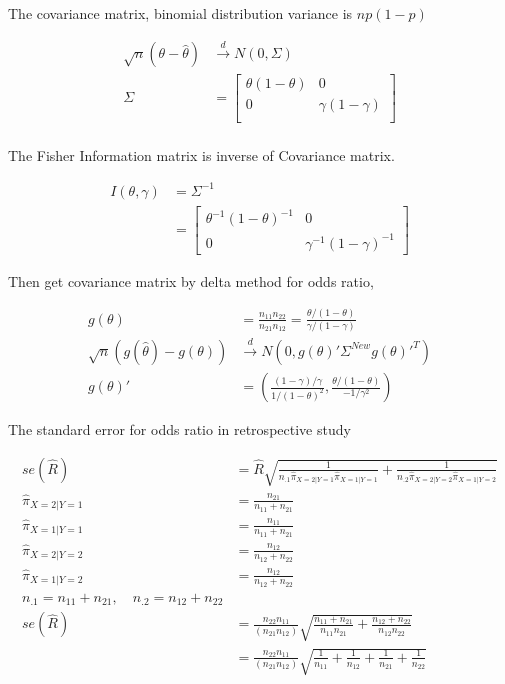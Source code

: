 	The covariance matrix, binomial distribution variance is $np(1-p)$
	
	\begin{align*}
		\sqrt{n} \left( \theta - \hat{\theta} \right) & \xrightarrow[]{d} N(0, \Sigma)\\
		\Sigma &= \begin{bmatrix}
			\theta(1-\theta) &  0 \\
			0 &  \gamma(1-\gamma) \\
		\end{bmatrix}\\
	\end{align*} 	
	
	The Fisher Information matrix is inverse of Covariance matrix.
	
	\begin{align*}
	  I(\theta, \gamma) &= \Sigma^{-1} \\
	  &= \begin{bmatrix}
			\theta^{-1}(1-\theta)^{-1} &  0 \\
			0 &  \gamma^{-1}(1-\gamma)^{-1} 
		\end{bmatrix}
	\end{align*} 		
	
	Then get covariance matrix by delta method for odds ratio, 
	
	\begin{align*}
		g(\theta) &= \frac{n_{11}n_{22}}{n_{21}n_{12}} = \frac{\theta/(1-\theta)}{\gamma/(1-\gamma)}\\
		\sqrt{n} \left( g(\hat\theta) - g({\theta}) \right) & \xrightarrow[]{d} N(0, g(\theta)' \Sigma^{New} g(\theta)'^T)\\  
		g(\theta)' &= \left( \frac{(1-\gamma)/\gamma}{1/(1-\theta)^2}, \frac{\theta/(1-\theta)}{-1/\gamma^2} \right)
	\end{align*} 
	
	The standard error for odds ratio in retrospective study
	
	\begin{align*}
		se(\hat R) &= \hat{R} \sqrt{\frac{1}{n_{.1}\hat{\pi}_{X=2|Y=1}\hat{\pi}_{X=1|Y=1} } + \frac{1}{n_{.2}\hat{\pi}_{X=2|Y=2} \hat {\pi}_{X=1|Y=2} } }\\
		\hat{\pi}_{X=2|Y=1} &= \frac{n_{21}}{n_{11}+ n_{21}}\\
		\hat{\pi}_{X=1|Y=1} &= \frac{n_{11}}{n_{11}+ n_{21}}\\
		\hat{\pi}_{X=2|Y=2} &=  \frac{n_{12}}{n_{12} + n_{22}}\\
		\hat {\pi}_{X=1|Y=2} &= \frac{n_{12}}{n_{12} + n_{22}}\\
		n_{.1} = n_{11}+ n_{21}, \quad n_{.2}=n_{12} + n_{22}\\
		se(\hat R) &= \frac{n_{22}n_{11}}{(n_{21}n_{12})} \sqrt{\frac{n_{11}+n_{21}}{n_{11}n_{21}} + \frac{n_{12}+n_{22}}{n_{12}n_{22}} }\\
		&= \frac{{n_{22}n_{11}}}{(n_{21}n_{12})} \sqrt{\frac{1}{n_{11}} + \frac{1}{n_{12}} + \frac{1}{n_{21}} + \frac{1}{n_{22}}}\\
	\end{align*}
	
